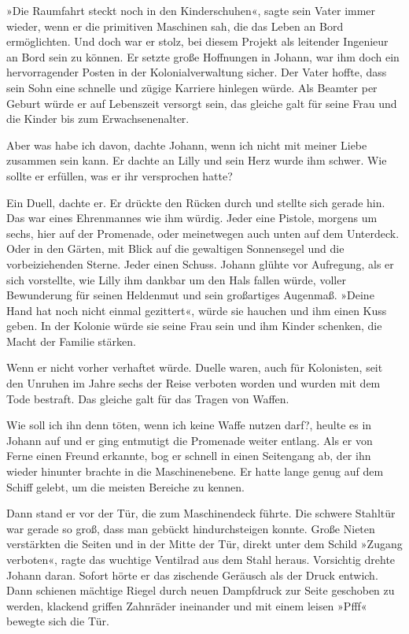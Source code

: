»Die Raumfahrt steckt noch in den Kinderschuhen«, sagte sein Vater
immer wieder, wenn er die primitiven Maschinen sah, die das Leben
an Bord ermöglichten. Und doch war er stolz, bei diesem Projekt als
leitender Ingenieur an Bord sein zu können. Er setzte große
Hoffnungen in Johann, war ihm doch ein hervorragender Posten in der
Kolonialverwaltung sicher. Der Vater hoffte, dass sein Sohn eine
schnelle und zügige Karriere hinlegen würde. Als Beamter per Geburt
würde er auf Lebenszeit versorgt sein, das gleiche galt für seine
Frau und die Kinder bis zum Erwachsenenalter.

Aber was habe ich davon, dachte Johann, wenn ich nicht mit meiner
Liebe zusammen sein kann. Er dachte an Lilly und sein Herz wurde
ihm schwer. Wie sollte er erfüllen, was er ihr versprochen hatte?

Ein Duell, dachte er. Er drückte den Rücken durch und stellte sich
gerade hin. Das war eines Ehrenmannes wie ihm würdig. Jeder eine
Pistole, morgens um sechs, hier auf der Promenade, oder meinetwegen
auch unten auf dem Unterdeck. Oder in den Gärten, mit Blick auf die
gewaltigen Sonnensegel und die vorbeiziehenden Sterne. Jeder einen
Schuss. Johann glühte vor Aufregung, als er sich vorstellte, wie
Lilly ihm dankbar um den Hals fallen würde, voller Bewunderung für
seinen Heldenmut und sein großartiges Augenmaß. »Deine Hand hat
noch nicht einmal gezittert«, würde sie hauchen und ihm einen Kuss
geben. In der Kolonie würde sie seine Frau sein und ihm Kinder
schenken, die Macht der Familie stärken.

Wenn er nicht vorher verhaftet würde. Duelle waren, auch für
Kolonisten, seit den Unruhen im Jahre sechs der Reise verboten
worden und wurden mit dem Tode bestraft. Das gleiche galt für das
Tragen von Waffen.

Wie soll ich ihn denn töten, wenn ich keine Waffe nutzen darf?,
heulte es in Johann auf und er ging entmutigt die Promenade weiter
entlang. Als er von Ferne einen Freund erkannte, bog er schnell in
einen Seitengang ab, der ihn wieder hinunter brachte in die
Maschinenebene. Er hatte lange genug auf dem Schiff gelebt, um die
meisten Bereiche zu kennen.

Dann stand er vor der Tür, die zum Maschinendeck führte. Die
schwere Stahltür war gerade so groß, dass man gebückt
hindurchsteigen konnte. Große Nieten verstärkten die Seiten und in
der Mitte der Tür, direkt unter dem Schild »Zugang verboten«, ragte
das wuchtige Ventilrad aus dem Stahl heraus. Vorsichtig drehte
Johann daran. Sofort hörte er das zischende Geräusch als der Druck
entwich. Dann schienen mächtige Riegel durch neuen Dampfdruck zur
Seite geschoben zu werden, klackend griffen Zahnräder ineinander
und mit einem leisen »Pfff« bewegte sich die Tür.

